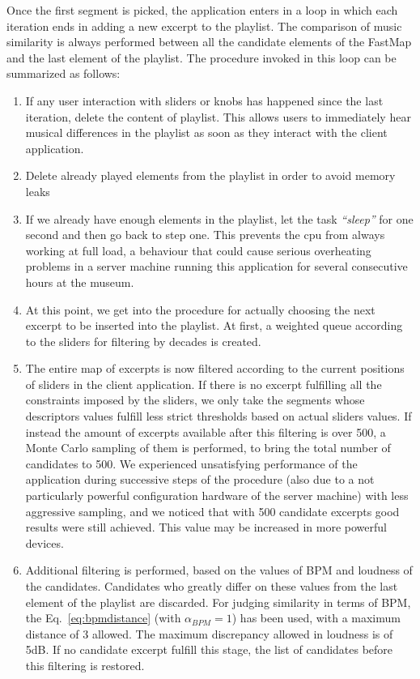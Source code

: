 Once the first segment is picked, the application enters in a loop in which each iteration ends in adding a new excerpt to the playlist. The comparison of music similarity is always performed between all the candidate elements of the FastMap and the last element of the playlist. The procedure invoked in this loop can be summarized as follows:
\begin{enumerate}
\item If any user interaction with sliders or knobs has happened since the last iteration, delete the content of playlist. This allows users to immediately hear musical differences in the playlist as soon as they interact with the client application. 
\item Delete already played elements from the playlist in order to avoid memory leaks
\item If we already have enough elements in the playlist, let the task \textit{``sleep''} for one second and then go back to step one. This prevents the cpu from always working at full load, a behaviour that could cause serious overheating problems in a server machine running this application for several consecutive hours at the museum.
\item At this point, we get into the procedure for actually choosing the next excerpt to be inserted into the playlist. At first, a weighted queue according to the sliders for filtering by decades is created.
\item The entire map of excerpts is now filtered according to the current positions of sliders in the client application. If there is no excerpt fulfilling all the constraints imposed by the sliders, we only take the segments whose descriptors values fulfill less strict thresholds based on actual sliders values. If instead the amount of excerpts available after this filtering is over 500, a Monte Carlo sampling of them is performed, to bring the total number of candidates to 500. We experienced unsatisfying performance of the application during successive steps of the procedure (also due to a not particularly powerful configuration hardware of the server machine) with less aggressive sampling, and we noticed that with 500 candidate excerpts good results were still achieved. This value may be increased in more powerful devices. \
\item Additional filtering is performed, based on the values of BPM and loudness of the candidates. Candidates who greatly differ on these values from the last element of the playlist are discarded. For judging similarity in terms of BPM, the Eq.~\ref{eq:bpmdistance} (with $\alpha_{BPM} = 1$) has been used, with a maximum distance of 3 allowed. The maximum discrepancy allowed in loudness is of 5dB. If no candidate excerpt fulfill this stage, the list of candidates before this filtering is restored. 

\end{enumerate}
